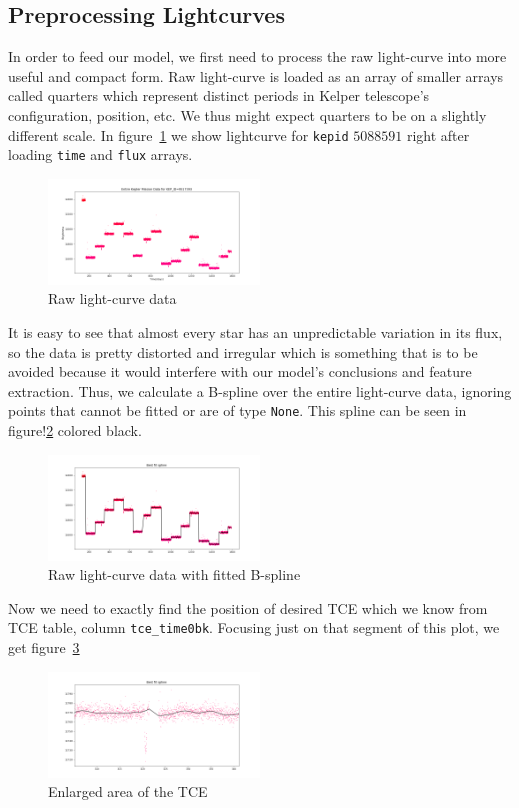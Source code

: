 \documentclass[twoside]{article}
\newcommand{\code}[1]{\texttt{#1}}
\begin{document}
\begin{multicols}{2}
\subsection{Preprocessing Lightcurves}
In order to feed our model, we first need to process the raw light-curve into more useful and compact form. Raw light-curve is loaded as an array of smaller arrays called quarters which represent distinct periods in Kelper telescope's configuration, position, etc. We thus might expect quarters to be on a slightly different scale. In figure~\ref{fig:raw_lc} we show lightcurve for \code{kepid} $5088591$ right after loading \code{time} and \code{flux} arrays.
\begin{figure}[H]
\includegraphics[width=0.5\textwidth]{rawLC-9517393}
\caption{Raw light-curve data}
\label{fig:raw_lc}
\end{figure}

It is easy to see that almost every star has an unpredictable variation in its flux, so the data is pretty distorted and irregular which is something that is to be avoided because it would interfere with our model's conclusions and feature extraction. Thus, we calculate a B-spline over the entire light-curve data, ignoring points that cannot be fitted or are of type \code{None}. This spline can be seen in figure!\ref{fig:raw_spline_lc} colored black.
\begin{figure}[H]
\includegraphics[width=0.5\textwidth]{splineLC-9517393}
\caption{Raw light-curve data with fitted B-spline}
\label{fig:raw_spline_lc}
\end{figure}

Now we need to exactly find the position of desired TCE which we know from TCE table, column \code{tce\_time0bk}. Focusing just on that segment of this plot, we get figure~\ref{fig:enlarged_tce}
\begin{figure}[H]
\includegraphics[width=0.5\textwidth]{splinezoomLC-9517393}
\caption{Enlarged area of the TCE}
\label{fig:enlarged_tce}
\end{figure}


\end{multicols}
\end{document}
